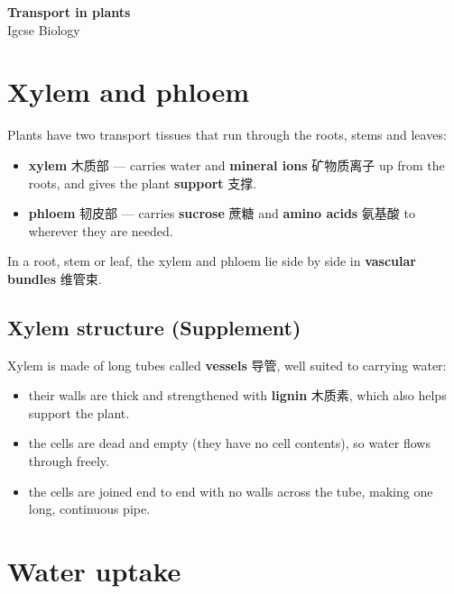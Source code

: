 \documentclass[11pt]{article}
\begin{document}
\begin{center}
  {\LARGE\bfseries Transport in plants}\\[0.35em]
  {\large Igcse Biology}
\end{center}
\vspace{0.6em}

\section*{Xylem and phloem}

Plants have two transport tissues that run through the roots, stems and leaves:

\begin{itemize}
\item \textbf{xylem} 木质部 — carries water and \textbf{mineral ions} 矿物质离子 up from the roots, and gives the plant \textbf{support} 支撑.

\item \textbf{phloem} 韧皮部 — carries \textbf{sucrose} 蔗糖 and \textbf{amino acids} 氨基酸 to wherever they are needed.

\end{itemize}

In a root, stem or leaf, the xylem and phloem lie side by side in \textbf{vascular bundles} 维管束.

\subsection*{Xylem structure (Supplement)}

Xylem is made of long tubes called \textbf{vessels} 导管, well suited to carrying water:

\begin{itemize}
\item their walls are thick and strengthened with \textbf{lignin} 木质素, which also helps support the plant.

\item the cells are dead and empty (they have no cell contents), so water flows through freely.

\item the cells are joined end to end with no walls across the tube, making one long, continuous pipe.

\end{itemize}

\section*{Water uptake}
\end{document}
